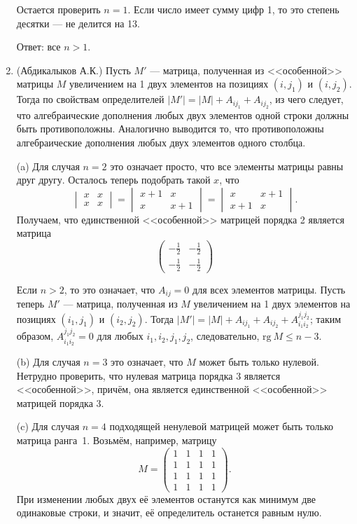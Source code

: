 \documentclass[11pt, a4paper]{article}
\begin{document}
\begin{enumerate}
Остается проверить $n = 1$. Если число имеет сумму цифр 1, то это степень десятки --- не делится на 13.

Ответ: все $n > 1$.

\item (Абдикалыков А.К.) Пусть $M'$ --- матрица, полученная из <<особенной>> матрицы $M$ увеличением на 1 двух элементов на позициях $(i, j_1)$ и $(i, j_2)$. Тогда по свойствам определителей $|M'| = |M| + A_{ij_1} + A_{ij_2}$, из чего следует, что алгебраические дополнения любых двух элементов одной строки должны быть противоположны. Аналогично выводится то, что противоположны алгебраические дополнения любых двух элементов одного столбца.

(a) Для случая $n = 2$ это означает просто, что все элементы матрицы равны друг другу. Осталось теперь подобрать такой $x$, что
$$
\begin{vmatrix}
  x & x \\
  x & x
\end{vmatrix} =
\begin{vmatrix}
  x + 1 & x \\
  x & x + 1
\end{vmatrix} =
\begin{vmatrix}
  x & x + 1 \\
  x + 1 & x
\end{vmatrix}.
$$
Получаем, что единственной <<особенной>> матрицей порядка 2 является матрица
$$
\begin{pmatrix}
  -\frac12 & -\frac12 \\
  -\frac12 & -\frac12
\end{pmatrix}
$$

Если $n > 2$, то это означает, что $A_{ij} = 0$ для всех элементов матрицы. Пусть теперь $M'$ --- матрица, полученная из $M$ увеличением на 1 двух элементов на позициях $(i_1, j_1)$ и $(i_2, j_2)$. Тогда $|M'| = |M| + A_{ij_1} + A_{ij_2} + A_{i_1i_2}^{j_1j_2}$; таким образом, $A_{i_1i_2}^{j_1j_2} = 0$ для любых $i_1, i_2, j_1, j_2$, следовательно, ${\mathrm{rg}}~M\leqslant n - 3$.

(b) Для случая $n = 3$ это означает, что $M$ может быть только нулевой. Нетрудно проверить, что нулевая матрица порядка 3 является <<особенной>>, причём, она является единственной <<особенной>> матрицей порядка 3.

(c) Для случая $n = 4$ подходящей ненулевой матрицей может быть только матрица ранга~1. Возьмём, например, матрицу
$$
M = \begin{pmatrix}
      1 & 1 & 1 & 1 \\
      1 & 1 & 1 & 1 \\
      1 & 1 & 1 & 1 \\
      1 & 1 & 1 & 1
    \end{pmatrix}.
$$
При изменении любых двух её элементов останутся как минимум две одинаковые строки, и значит, её определитель останется равным нулю.


\end{enumerate}
\end{document}
